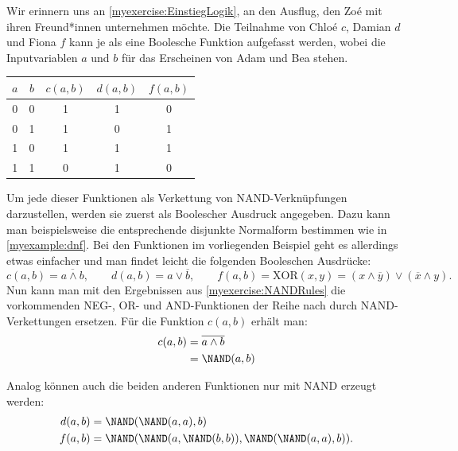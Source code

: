 \begin{myexample}\label{myexample:DamianausNAND}
    Wir erinnern uns an \cref{myexercise:EinstiegLogik}, an den Ausflug, den Zoé mit ihren Freund*innen unternehmen möchte. Die Teilnahme von Chloé $c$, Damian $d$ und Fiona $f$ kann je als eine Boolesche Funktion aufgefasst werden, wobei die Inputvariablen $a$ und $b$ für das Erscheinen von Adam und Bea stehen.
    \begin{center}
        \begin{tabular}{ |c|c||c|c|c| } 
         \hline
         $a$ & $b$ & $c(a,b)$ & $d(a,b)$ & $f(a,b)$ \\ 
         \hline
         0 & 0 & 1 & 1 & 0 \\ 
         0 & 1 & 1 & 0 & 1\\
         1 & 0 & 1 & 1 & 1 \\
         1 & 1 & 0 & 1 &  0\\ 
         \hline
        \end{tabular}
    \end{center}

    Um jede dieser Funktionen als Verkettung von NAND-Verknüpfungen darzustellen, werden sie zuerst als Boolescher Ausdruck angegeben. Dazu kann man beispielsweise die entsprechende disjunkte Normalform bestimmen wie in \cref{myexample:dnf}. Bei den Funktionen im vorliegenden Beispiel geht es allerdings etwas einfacher und man findet leicht die folgenden Booleschen Ausdrücke:
    $$ c(a,b) = \overline{a\wedge b}, \qquad d(a,b) = a \vee \overline{b}, \qquad f(a,b) =\mathrm{XOR}(x,y) = (x\wedge \overline{y}) \vee (\overline{x} \wedge y). $$
    Nun kann man mit den Ergebnissen aus \cref{myexercise:NANDRules} die vorkommenden NEG-, OR- und AND-Funktionen der Reihe nach durch NAND-Verkettungen ersetzen. Für die Funktion $c(a,b)$ erhält man:
    \begin{align*}
        c(a,b)  & = \overline{a\wedge b} \\
                & = \NAND(a,b)
    \end{align*}
    
    Analog können auch die beiden anderen Funktionen nur mit NAND erzeugt werden:
    \begin{align*}
        d(a,b)  & = \NAND(\NAND(a, a) , b) \\
        f(a,b)  & = \NAND( \NAND(a, \NAND(b,b)), \NAND(\NAND(a,a),b)).
    \end{align*}
\end{myexample}

